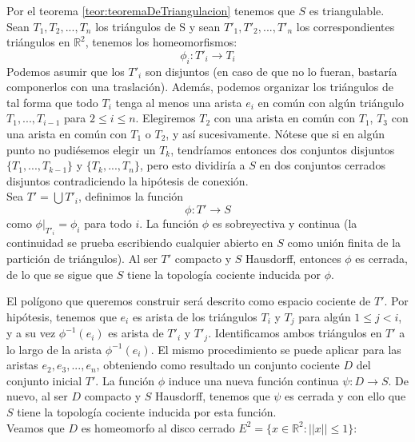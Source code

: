 \documentclass[a4paper,11pt,spanish, twoside, leqno]{tfg-uam}
\newcommand*{\reales}{\mathbb{R}}
\theoremstyle{definition}
\begin{document}
Por el teorema \ref{teor:teoremaDeTriangulacion} tenemos que $S$ es triangulable. Sean $T_1, T_2, ..., T_n$ los triángulos de S y sean $T'_1, T'_2, ...,  T'_n$ los correspondientes triángulos en $\reales^2$, tenemos los homeomorfismos:
\[ \phi_i: T'_i \longrightarrow T_i \]
Podemos asumir que los $T'_i$ son disjuntos (en caso de que no lo fueran, bastaría componerlos con una traslación). Además, podemos organizar los triángulos de tal forma que todo $T_i$ tenga al menos una arista $e_i$ en común con algún triángulo $T_1, ..., T_{i-1}$ para $2\leq i \leq n$. Elegiremos $T_2$ con una arista en común con $T_1$, $T_3$ con una arista en común con $T_1$ o $T_2$, y así sucesivamente. Nótese que si en algún punto no pudiésemos elegir un $T_k$, tendríamos entonces dos conjuntos disjuntos $\{T_1, ..., T_{k-1} \}$ y $\{T_k, ..., T_n\}$, pero esto dividiría a $S$ en dos conjuntos cerrados disjuntos contradiciendo la hipótesis de conexión.\\
Sea $T' = \bigcup T'_i$, definimos la función 
\[ \phi: T' \longrightarrow S \]
como $\phi |_{T'_i} = \phi_i$ para todo $i$. La función $\phi$ es sobreyectiva y continua (la continuidad se prueba escribiendo cualquier abierto en $S$ como unión finita de la partición de triángulos). Al ser $T'$ compacto y $S$ Hausdorff, entonces $\phi$ es cerrada, de lo que se sigue que $S$ tiene la topología cociente inducida por $\phi$.

El polígono que queremos construir será descrito como espacio cociente de $T'$. Por hipótesis, tenemos que $e_i$ es arista de los triángulos $T_i$ y $T_j$ para algún $1\leq j < i$, y a su vez $\phi^{-1}(e_i)$ es arista de $T'_i$ y $T'_j$. Identificamos ambos triángulos en $T'$ a lo largo de la arista $\phi^{-1}(e_i)$. El mismo procedimiento se puede aplicar para las aristas $e_2, e_3, ..., e_n$, obteniendo como resultado un conjunto cociente $D$ del conjunto inicial $T'$. La función $\phi$ induce una nueva función continua $\psi: D \longrightarrow S$. De nuevo, al ser $D$ compacto y $S$ Hausdorff, tenemos que $\psi$ es   cerrada y con ello que $S$ tiene la topología cociente inducida por esta función. \\
Veamos que $D$ es homeomorfo al disco cerrado $E^2 = \{x\in \reales^2: ||x||\leq 1\}$:
\end{document}

